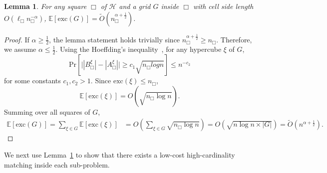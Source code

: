 \documentclass[11pt,onecolumn]{article}
\def\mcH{{\mathcal{H}}}
\def\mbE{{\mathbb{E}}}
\newcommand{\cell}{\Box}
\newcommand{\excess}{\mathrm{exc}}
\newcommand{\prob}[1]{\mathrm{Pr}\left[#1\right]}
\newtheorem{lemma}{Lemma}[section]
\begin{document}
\begin{lemma}\label{lemma:convergence_excess}
    For any square $\cell$ of $\mcH$ and a grid $G$ inside $\cell$ with cell side length $O(\ell_\cell n_\cell^{-\alpha})$, $\mbE[\excess(G)]= \tilde{O}(n_\cell^{\alpha + \frac{1}{2}})$. 
\end{lemma}
\begin{proof}
    If $\alpha\ge \frac{1}{2}$, the lemma statement holds trivially since $n_\cell^{\alpha+\frac{1}{2}} \ge n_\cell$. Therefore, we assume $\alpha\le \frac{1}{2}$.
    Using the Hoeffding\textquoteright{}s inequality~\cite{hoeffding1994probability}, for any hypercube $\xi$ of $G$,
    \begin{equation*}
        \prob{\big||B_\cell^\xi| - |A_\cell^\xi|\big|\ge c_1\sqrt{n_\cell log n}}\le n^{-c_2}\label{eq:excess}
    \end{equation*}
    for some constants $c_1, c_2 > 1$. Since $\excess(\xi)\le n_\cell$, 
    \begin{equation*}
        \mbE[\excess(\xi)]= O(\sqrt{n_\cell\log n}).\label{eq:excess_cell}
    \end{equation*}
    Summing over all squares of $G$,
    \begin{align*}
        \mbE[\excess(G)] = \sum_{\xi\in G} \mbE[\excess(\xi)] &=O\left(\sum_{\xi\in G} \sqrt{n_\cell\log n}\right) = O\left(\sqrt{n\log n\times |G|}\right) = \tilde{O}(n^{\alpha+\frac{1}{2}}).\label{eq:excess-dense}
    \end{align*}
\end{proof}

We next use Lemma~\ref{lemma:convergence_excess} to show that there exists a low-cost high-cardinality matching inside each sub-problem.
\end{document}
